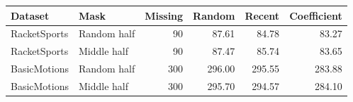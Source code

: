 \begin{tabular}{llrrrr}\toprule
Dataset & Mask & Missing & Random & Recent & Coefficient \\
\midrule
RacketSports & Random half & 90 & 87.61 & 84.78 & 83.27 \\
RacketSports & Middle half & 90 & 87.47 & 85.74 & 83.65 \\
BasicMotions & Random half & 300 & 296.00 & 295.55 & 283.88 \\
BasicMotions & Middle half & 300 & 295.70 & 294.57 & 284.10 \\
\bottomrule\end{tabular}
